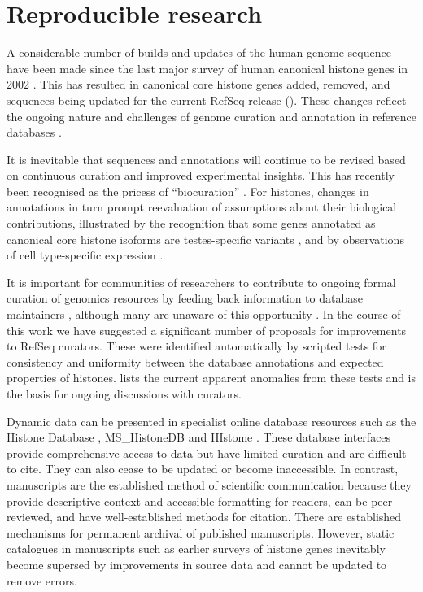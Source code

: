 \section{Reproducible research}

  A considerable number of builds and updates of the human genome sequence have been made
  since the last major survey of human canonical histone genes in 2002 \citep{Marzluff02}.
  This has resulted in
  \AddedSinceReference{} canonical core histone genes added,
  \RemovedSinceReference{} removed,
  and \SequencesUpdatedSinceReference{} sequences
  being updated for the current RefSeq release ().
  These changes reflect the ongoing nature and challenges of
  genome curation and annotation in reference databases \citep{BorkKoonin1998}.

  It is inevitable that sequences and annotations will continue to be revised
  based on continuous curation and improved experimental insights.
  This has recently been recognised as the pricess of ``biocuration'' \citep{biocuration2018}.
  For histones, changes in annotations in turn prompt 
  reevaluation of assumptions about their biological contributions,
  illustrated by the recognition that some genes
  annotated as canonical core histone isoforms are testes-specific variants \citep{Talbert2012},
  and by observations of cell type-specific expression \citep{YangGenomeBiol2011,Molden2015}.

  It is important for communities of researchers to contribute
  to ongoing formal curation of genomics resources
  by feeding back information to database maintainers \citep{SteinNRG2001},
  although many are unaware of this opportunity \citep{HollidaySPR2015}.
  In the course of this work we have suggested a significant number of proposals
  for improvements to RefSeq curators.
  These were identified automatically by scripted tests for consistency and uniformity
  between the database annotations and expected properties of histones.
   lists the current apparent anomalies from these tests
  and is the basis for ongoing discussions with curators.

  Dynamic data can be presented in specialist online database resources
  such as the Histone Database \citep{HistoneDB2016}, 
  MS_HistoneDB \citep{ElkennaniGovin2017} and HIstome \citep{HIstome2012}.
  These database interfaces provide comprehensive access to data
  but have limited curation and are difficult to cite.
  They can also cease to be updated or become inaccessible.
  In contrast, manuscripts are the established method of scientific communication
  because they provide descriptive context and accessible formatting for readers,
  can be peer reviewed, and have well-established methods for citation.
  There are established mechanisms for permanent archival of published manuscripts.
  However, static catalogues in manuscripts
  such as earlier surveys of histone genes \citep{AlbigHumangen1997,Marzluff02}
  inevitably become supersed by improvements in source data and cannot be updated to remove errors.

